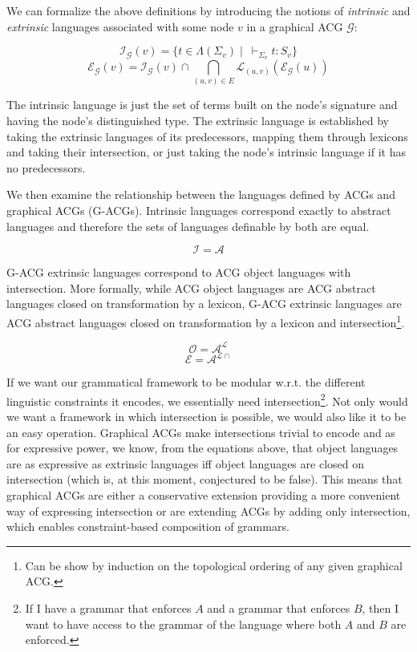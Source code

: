 \documentclass{llncs}
\begin{document}
We can formalize the above definitions by introducing the notions of
\emph{intrinsic} and \emph{extrinsic} languages associated with some node $v$
in a graphical ACG $\mathcal{G}$:

$$
\mathcal{I}_{\mathcal{G}}(v) = \{t \in \Lambda(\Sigma_v)
\mid\ \vdash_{\Sigma_v} t : S_v\}
$$
$$
\mathcal{E}_{\mathcal{G}}(v) = \mathcal{I}_{\mathcal{G}}(v) \cap
\bigcap_{(u,v) \in E} \mathcal{L}_{(u,v)}(\mathcal{E}_{\mathcal{G}}(u))
$$

The intrinsic language is just the set of terms built on the node's
signature and having the node's distinguished type. The extrinsic
language is established by taking the extrinsic languages of its
predecessors, mapping them through lexicons and taking their
intersection, or just taking the node's intrinsic language if it has no
predecessors.

We then examine the relationship between the languages defined by ACGs
and graphical ACGs (G-ACGs). Intrinsic languages correspond exactly to
abstract languages and therefore the sets of languages definable by both
are equal.

$$
\mathcal{I} = \mathcal{A}
$$

G-ACG extrinsic languages correspond to ACG object languages with
intersection. More formally, while ACG object languages are ACG abstract
languages closed on transformation by a lexicon, G-ACG extrinsic languages are
ACG abstract languages closed on transformation by a lexicon and
intersection\footnote{Can be show by induction on the topological ordering of
  any given graphical ACG.}.

$$
\mathcal{O} = \mathcal{A}^{\mathcal{L}}
$$
$$
\mathcal{E} = \mathcal{A}^{\mathcal{L}{\cap}}
$$

If we want our grammatical framework to be modular w.r.t. the different
linguistic constraints it encodes, we essentially need
intersection\footnote{If I have a grammar that enforces $A$ and a grammar that
  enforces $B$, then I want to have access to the grammar of the language
  where both $A$ and $B$ are enforced.}. Not only would we want a framework in
which intersection is possible, we would also like it to be an easy
operation. Graphical ACGs make intersections trivial to encode and as for
expressive power, we know, from the equations above, that object languages are
as expressive as extrinsic languages iff object languages are closed on
intersection (which is, at this moment, conjectured to be false). This means
that graphical ACGs are either a conservative extension providing a more
convenient way of expressing intersection or are extending ACGs by adding
only intersection, which enables constraint-based composition of grammars. 
\end{document}
